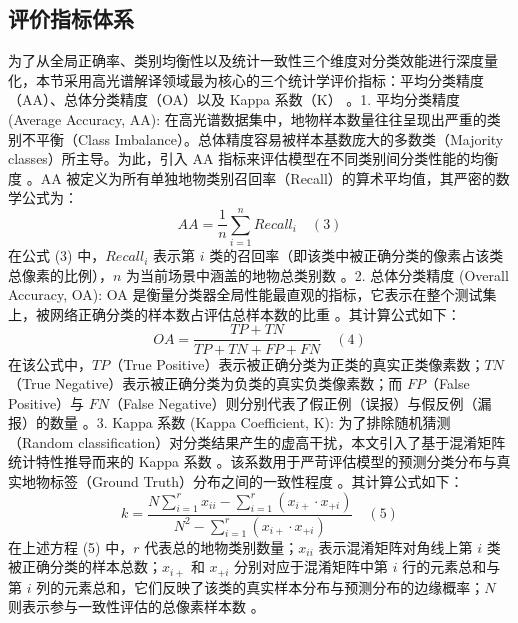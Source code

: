 \subsection{评价指标体系}
为了从全局正确率、类别均衡性以及统计一致性三个维度对分类效能进行深度量化，本节采用高光谱解译领域最为核心的三个统计学评价指标：平均分类精度（AA）、总体分类精度（OA）以及 Kappa 系数（K） 。1. 平均分类精度 (Average Accuracy, AA):
在高光谱数据集中，地物样本数量往往呈现出严重的类别不平衡（Class Imbalance）。总体精度容易被样本基数庞大的多数类（Majority classes）所主导。为此，引入 AA 指标来评估模型在不同类别间分类性能的均衡度 。AA 被定义为所有单独地物类别召回率（Recall）的算术平均值，其严密的数学公式为：
$$AA = \frac{1}{n} \sum_{i=1}^{n} Recall_{i} \quad (3)$$在公式 (3) 中，$Recall_{i}$ 表示第 $i$ 类的召回率（即该类中被正确分类的像素占该类总像素的比例），$n$ 为当前场景中涵盖的地物总类别数 。2. 总体分类精度 (Overall Accuracy, OA):
OA 是衡量分类器全局性能最直观的指标，它表示在整个测试集上，被网络正确分类的样本数占评估总样本数的比重 。其计算公式如下：
$$OA = \frac{TP + TN}{TP + TN + FP + FN} \quad (4)$$在该公式中，$TP$（True Positive）表示被正确分类为正类的真实正类像素数；$TN$（True Negative）表示被正确分类为负类的真实负类像素数；而 $FP$（False Positive）与 $FN$（False Negative）则分别代表了假正例（误报）与假反例（漏报）的数量 。3. Kappa 系数 (Kappa Coefficient, K):
为了排除随机猜测（Random classification）对分类结果产生的虚高干扰，本文引入了基于混淆矩阵统计特性推导而来的 Kappa 系数 。该系数用于严苛评估模型的预测分类分布与真实地物标签（Ground Truth）分布之间的一致性程度 。其计算公式如下：
$$k = \frac{N\sum_{i=1}^{r}x_{ii}-\sum_{i=1}^{r}(x_{i+}\cdot x_{+i})}{N^{2}-\sum_{i=1}^{r}(x_{i+}\cdot x_{+i})} \quad (5)$$在上述方程 (5) 中，$r$ 代表总的地物类别数量；$x_{ii}$ 表示混淆矩阵对角线上第 $i$ 类被正确分类的样本总数；$x_{i+}$ 和 $x_{+i}$ 分别对应于混淆矩阵中第 $i$ 行的元素总和与第 $i$ 列的元素总和，它们反映了该类的真实样本分布与预测分布的边缘概率；$N$ 则表示参与一致性评估的总像素样本数 。

